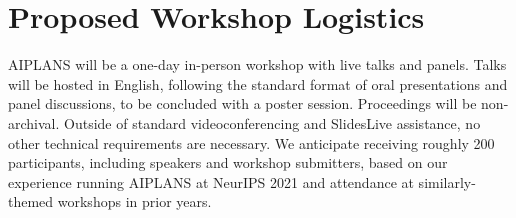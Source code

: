 \documentclass{article}
\begin{document}




\section*{Proposed Workshop Logistics}

AIPLANS will be a one-day in-person workshop with live talks and panels. Talks will be hosted in English, following the standard format of oral presentations and panel discussions, to be concluded with a poster session. Proceedings will be non-archival. Outside of standard videoconferencing and SlidesLive assistance, no other technical requirements are necessary. We anticipate receiving roughly 200 participants, including speakers and workshop submitters, based on our experience running AIPLANS at NeurIPS 2021 and attendance at similarly-themed workshops in prior years.
\end{document}
